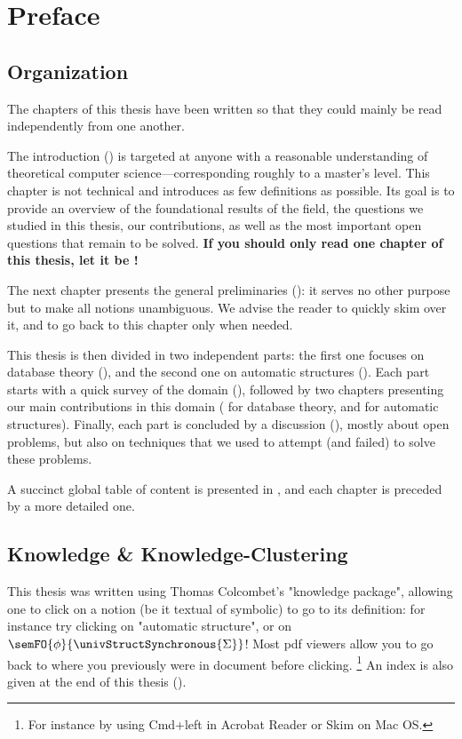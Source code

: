 \chapter*{Preface}

\section*{Organization}

The chapters of this thesis have been written so that they could mainly
be read independently from one another.

The introduction () is targeted at anyone with
a reasonable understanding of theoretical computer science---corresponding roughly
to a master's level. This chapter is not technical and introduces as few definitions
as possible. Its goal is to provide an overview of the foundational results of the
field, the questions we studied in this thesis, our contributions, as well
as the most important open questions that remain to be solved.
\textbf{If you should only read one chapter of this thesis, let it be !}

The next chapter presents the general preliminaries ():
it serves no other purpose but to make all notions unambiguous. We advise
the reader to quickly skim over it, and to go back to this chapter only when
needed.

This thesis is then divided in two independent parts:
the first one focuses on database theory (),
and the second one on automatic structures ().
Each part starts with a quick survey of the domain
(),
followed by two chapters presenting our main contributions in this domain
( for database theory,
and  for automatic structures).
Finally, each part is concluded by a discussion (),
mostly about open problems, but also on techniques that we used to attempt (and failed) to solve these problems.

A succinct global table of content is presented in ,
and each chapter is preceded by a more detailed one.

\section*{Knowledge \& Knowledge-Clustering}
This thesis was written using Thomas Colcombet's "knowledge package", allowing
one to click on a notion (be it textual of symbolic) to go to its definition:
for instance try clicking on "automatic structure", or on
$\semFO{\phi}{\univStructSynchronous{\Sigma}}$!
Most pdf viewers allow you to go back to where you previously were
in document before clicking.%
\footnote{For instance
by using Cmd+left in Acrobat Reader or Skim on Mac OS.}
An index is also given at the end of this thesis ().

